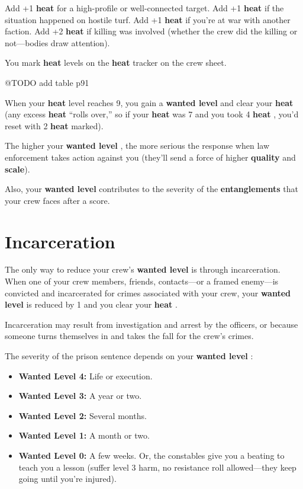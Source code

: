 \documentclass[11pt,fleqn,a5paper]{book}
\newcommand{\gameterm}[1]{\textbf{#1}}
\begin{document}
Add +1 \gameterm{heat}  for a high-profile or well-connected target. Add +1 \gameterm{heat}  if the situation happened on hostile turf. Add +1 \gameterm{heat}  if you’re at war with another faction. Add +2 \gameterm{heat}  if killing was involved (whether the crew did the killing or not---bodies draw attention).

You mark \gameterm{heat}  levels on the \gameterm{heat}  tracker on the crew sheet.

@TODO add table p91

When your \gameterm{heat}  level reaches 9, you gain a \gameterm{wanted level}  and clear your \gameterm{heat}  (any excess \gameterm{heat}  “rolls over,” so if your \gameterm{heat}  was 7 and you took 4 \gameterm{heat} , you’d reset with 2 \gameterm{heat}  marked).

The higher your \gameterm{wanted level} , the more serious the response when law enforcement takes action against you (they’ll send a force of higher \textbf{quality} and \textbf{scale}).

Also, your \gameterm{wanted level}  contributes to the severity of the \textbf{entanglements} that your crew faces after a score.

\section{Incarceration}

The only way to reduce your crew’s \gameterm{wanted level}  is through incarceration. When one of your crew members, friends, contacts---or a framed enemy---is convicted and incarcerated for crimes associated with your crew, your \gameterm{wanted level}  is reduced by 1 and you clear your \gameterm{heat} .

Incarceration may result from investigation and arrest by the officers, or because someone turns themselves in and takes the fall for the crew’s crimes.

The severity of the prison sentence depends on your \gameterm{wanted level} :

\begin{itemize}
	\item \gameterm{Wanted Level 4: } Life or execution.
	\item \gameterm{Wanted Level 3:}  A year or two.
	\item \gameterm{Wanted Level 2:}  Several months.
	\item \gameterm{Wanted Level 1:}  A month or two.
	\item \gameterm{Wanted Level 0:}  A few weeks. Or, the constables give you a beating to teach you a lesson (suffer level 3 harm, no resistance roll allowed---they keep going until you’re injured).
\end{itemize}
\end{document}
